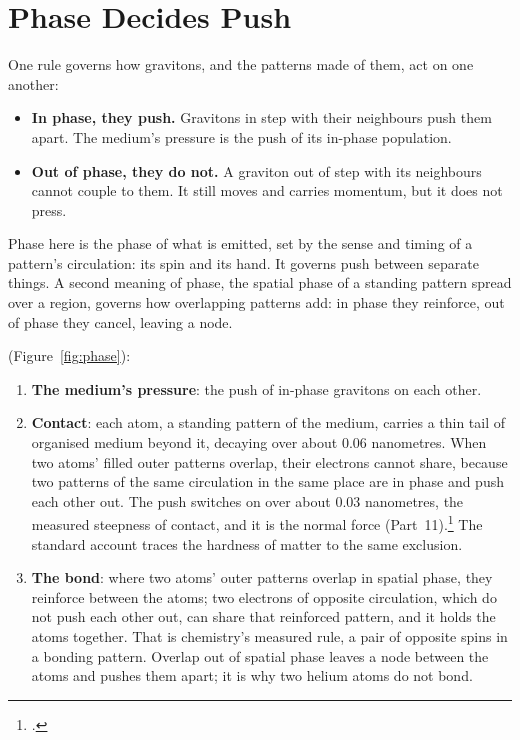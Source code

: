 \documentclass[11pt,a4paper]{article}
\newcommand{\fn}[1]{\footnote{\citealp{#1}.}}
\begin{document}
\section{Phase Decides Push}
\label{sec:phase}

\begin{hypbar}
One rule governs how gravitons, and the patterns made of them, act on one another:
\begin{itemize}
\item \textbf{In phase, they push.} Gravitons in step with their neighbours push them apart. The medium's pressure is the push of its in-phase population.
\item \textbf{Out of phase, they do not.} A graviton out of step with its neighbours cannot couple to them. It still moves and carries momentum, but it does not press.
\end{itemize}
Phase here is the phase of what is emitted, set by the sense and timing of a pattern's circulation: its spin and its hand. It governs push between separate things. A second meaning of phase, the spatial phase of a standing pattern spread over a region, governs how overlapping patterns add: in phase they reinforce, out of phase they cancel, leaving a node.
\end{hypbar}

 (Figure~\ref{fig:phase}):
\begin{enumerate}
\item \textbf{The medium's pressure}: the push of in-phase gravitons on each other.
\item \textbf{Contact}: each atom, a standing pattern of the medium, carries a thin tail of organised medium beyond it, decaying over about 0.06 nanometres. When two atoms' filled outer patterns overlap, their electrons cannot share, because two patterns of the same circulation in the same place are in phase and push each other out. The push switches on over about 0.03 nanometres, the measured steepness of contact, and it is the normal force (Part~11).\fn{rashadaPart11} The standard account traces the hardness of matter to the same exclusion.
\item \textbf{The bond}: where two atoms' outer patterns overlap in spatial phase, they reinforce between the atoms; two electrons of opposite circulation, which do not push each other out, can share that reinforced pattern, and it holds the atoms together. That is chemistry's measured rule, a pair of opposite spins in a bonding pattern. Overlap out of spatial phase leaves a node between the atoms and pushes them apart; it is why two helium atoms do not bond.
\end{enumerate}
\end{document}
